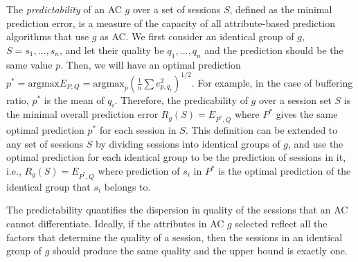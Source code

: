 The {\it predictability} of an AC $g$ over a set of sessions $S$, defined as the minimal prediction error, is a measure of the capacity of all attribute-based prediction algorithms that use $g$ as AC. We first consider an identical group of $g$, $S=s_1,\dots,s_n$, and let their quality be $q_1,\dots,q_n$ and the prediction should be the same value $p$. Then, we will have an optimal prediction $p^*=\textrm{argmax}E_{P,Q}=\textrm{argmax}_p\left(\frac{1}{n}\sum e_{p,q_i}^2\right)^{1/2}$. For example, in the case of buffering ratio, $p^*$ is the mean of $q_i$. Therefore, the predicability of $g$ over a session set $S$ is the minimal overall prediction error $R_g(S)=E_{P^*,Q}$ where $P^*$ gives the same optimal prediction $p^*$ for each session in $S$.
This definition can be extended to any set of sessions $S$ by dividing sessions into identical groups of $g$, and use the optimal prediction for each identical group to be the prediction of sessions in it, i.e., $R_g(S)=E_{P^*,Q}$ where prediction of $s_i$ in $P^*$ is the optimal prediction of the identical group that $s_i$ belongs to.

The predictability quantifies the dispersion in quality of the sessions that an AC cannot differentiate. Ideally, if the attributes in AC $g$ selected reflect all the factors that determine the quality of a session, then the sessions in an identical group of $g$ should produce the same quality and the upper bound is exactly one. 




